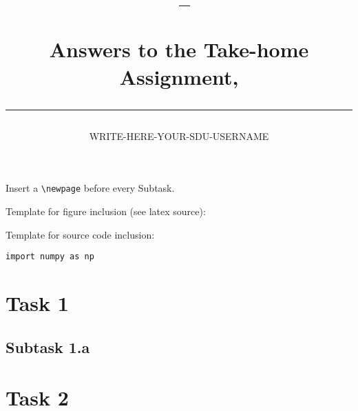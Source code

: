 \documentclass[a4paper,10pt]{article}
\author{WRITE-HERE-YOUR-SDU-USERNAME}
\title{\begin{flushleft}
\vspace{-4ex}
\courseid~-- \coursename \\[0.2cm]
{\Large Answers to the Take-home Assignment, \term \\[3ex]
\hrule}
\end{flushleft}
}
\date{}
\begin{document}
\maketitle





Insert a \verb=\newpage= before every Subtask.

\bigskip
\bigskip
Template for figure inclusion (see latex source):

\begin{figure}[htb]
\begin{center}
\end{center}
\end{figure}


\bigskip
\bigskip
Template for source code inclusion:

\begin{lstlisting}
import numpy as np

\end{lstlisting}



\clearpage\newpage
\section*{Task 1}
\subsection*{Subtask 1.a}




\clearpage\newpage
\section*{Task 2}
\end{document}
